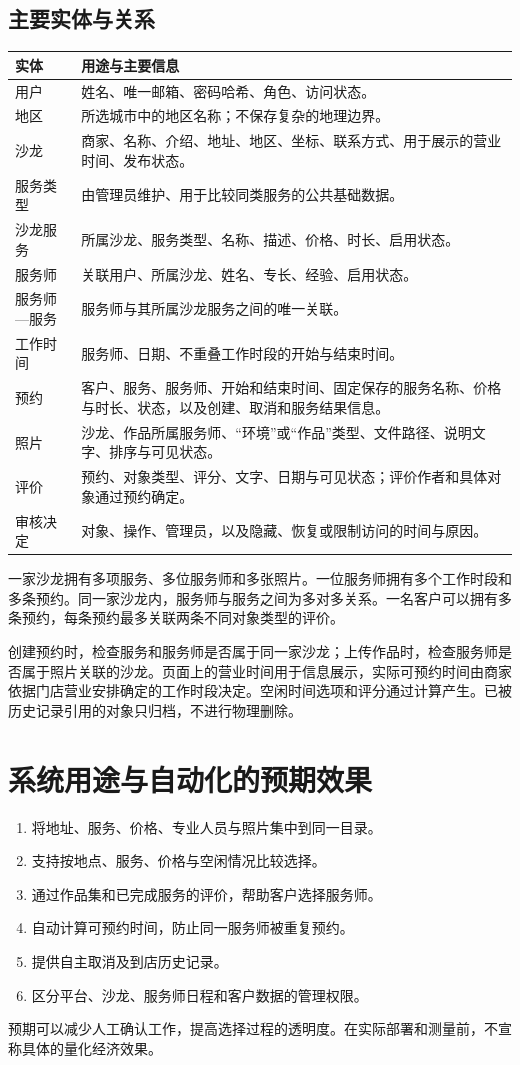 \subsection{主要实体与关系}
\begin{longtable}{L{3.4cm}L{11.4cm}}
\toprule 实体 & 用途与主要信息 \\ \midrule
\endhead
用户 & 姓名、唯一邮箱、密码哈希、角色、访问状态。 \\
地区 & 所选城市中的地区名称；不保存复杂的地理边界。 \\
沙龙 & 商家、名称、介绍、地址、地区、坐标、联系方式、用于展示的营业时间、发布状态。 \\
服务类型 & 由管理员维护、用于比较同类服务的公共基础数据。 \\
沙龙服务 & 所属沙龙、服务类型、名称、描述、价格、时长、启用状态。 \\
服务师 & 关联用户、所属沙龙、姓名、专长、经验、启用状态。 \\
服务师—服务 & 服务师与其所属沙龙服务之间的唯一关联。 \\
工作时间 & 服务师、日期、不重叠工作时段的开始与结束时间。 \\
预约 & 客户、服务、服务师、开始和结束时间、固定保存的服务名称、价格与时长、状态，以及创建、取消和服务结果信息。 \\
照片 & 沙龙、作品所属服务师、“环境”或“作品”类型、文件路径、说明文字、排序与可见状态。 \\
评价 & 预约、对象类型、评分、文字、日期与可见状态；评价作者和具体对象通过预约确定。 \\
审核决定 & 对象、操作、管理员，以及隐藏、恢复或限制访问的时间与原因。 \\
\bottomrule
\end{longtable}
一家沙龙拥有多项服务、多位服务师和多张照片。一位服务师拥有多个工作时段和多条预约。同一家沙龙内，服务师与服务之间为多对多关系。一名客户可以拥有多条预约，每条预约最多关联两条不同对象类型的评价。

创建预约时，检查服务和服务师是否属于同一家沙龙；上传作品时，检查服务师是否属于照片关联的沙龙。页面上的营业时间用于信息展示，实际可预约时间由商家依据门店营业安排确定的工作时段决定。空闲时间选项和评分通过计算产生。已被历史记录引用的对象只归档，不进行物理删除。

\section{系统用途与自动化的预期效果}
\begin{enumerate}
\item 将地址、服务、价格、专业人员与照片集中到同一目录。
\item 支持按地点、服务、价格与空闲情况比较选择。
\item 通过作品集和已完成服务的评价，帮助客户选择服务师。
\item 自动计算可预约时间，防止同一服务师被重复预约。
\item 提供自主取消及到店历史记录。
\item 区分平台、沙龙、服务师日程和客户数据的管理权限。
\end{enumerate}
预期可以减少人工确认工作，提高选择过程的透明度。在实际部署和测量前，不宣称具体的量化经济效果。


